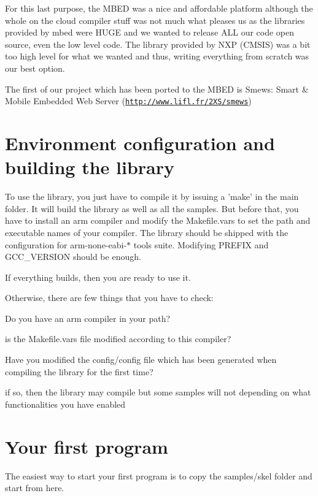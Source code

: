 For this last purpose, the M\-B\-E\-D was a nice and affordable platform although the whole on the cloud compiler stuff was not much what pleases us as the libraries provided by mbed were H\-U\-G\-E and we wanted to release A\-L\-L our code open source, even the low level code. The library provided by N\-X\-P (C\-M\-S\-I\-S) was a bit too high level for what we wanted and thus, writing everything from scratch was our best option.

The first of our project which has been ported to the M\-B\-E\-D is Smews\-: Smart \& Mobile Embedded Web Server (\href{http://www.lifl.fr/2XS/smews}{\tt http\-://www.\-lifl.\-fr/2\-X\-S/smews})\hypertarget{start_how}{}\section{Environment configuration and building the library}\label{start_how}
To use the library, you just have to compile it by issuing a {\ttfamily 'make'} in the main folder. It will build the library as well as all the samples. But before that, you have to install an arm compiler and modify the Makefile.\-vars to set the path and executable names of your compiler. The library should be shipped with the configuration for arm-\/none-\/eabi-\/$\ast$ tools suite. Modifying {\ttfamily P\-R\-E\-F\-I\-X} and {\ttfamily G\-C\-C\-\_\-\-V\-E\-R\-S\-I\-O\-N} should be enough.




If everything builds, then you are ready to use it.

Otherwise, there are few things that you have to check\-:
\begin{DoxyItemize}
\item Do you have an arm compiler in your path?
\begin{DoxyItemize}
\item is the {\ttfamily Makefile.\-vars} file modified according to this compiler?
\end{DoxyItemize}
\item Have you modified the config/config file which has been generated when compiling the library for the first time?
\begin{DoxyItemize}
\item if so, then the library may compile but some samples will not depending on what functionalities you have enabled
\end{DoxyItemize}
\end{DoxyItemize}\hypertarget{start_first-program}{}\section{Your first program}\label{start_first-program}
The easiest way to start your first program is to copy the samples/skel folder and start from here.

